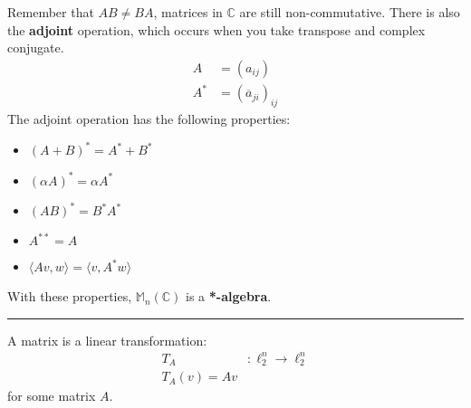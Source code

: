\documentclass[8pt]{extarticle}
\newcommand{\C}{\mathbb{C}}
\begin{document}
   Remember that $AB \neq BA$, matrices in $\C$ are still non-commutative. There is also the \textbf{adjoint} operation, which occurs when you take transpose and complex conjugate.
   \begin{align*}
     A &= (a_{ij})\\
     A^* &= (\overline{a}_{ji})_{ij}
   \end{align*}
   The adjoint operation has the following properties:
   \begin{itemize}
     \item $(A+B)^* = A^* + B^*$
     \item $(\alpha A)^* = \alpha A^*$
     \item $(AB)^* = B^*A^*$
     \item $A^{**} = A$
      \item $\langle Av,w\rangle = \langle v,A^*w\rangle$
  \end{itemize}
  With these properties, $\mathbb{M}_n(\C)$ is a \textbf{*-algebra}.\\
  \rule{\textwidth}{0.4pt}
  A matrix is a linear transformation:
  \begin{align*}
    T_A&: \ell_2^n \rightarrow \ell_2^n\\
    T_A(v) = Av
  \end{align*}
  for some matrix $A$.\\
\end{document}

